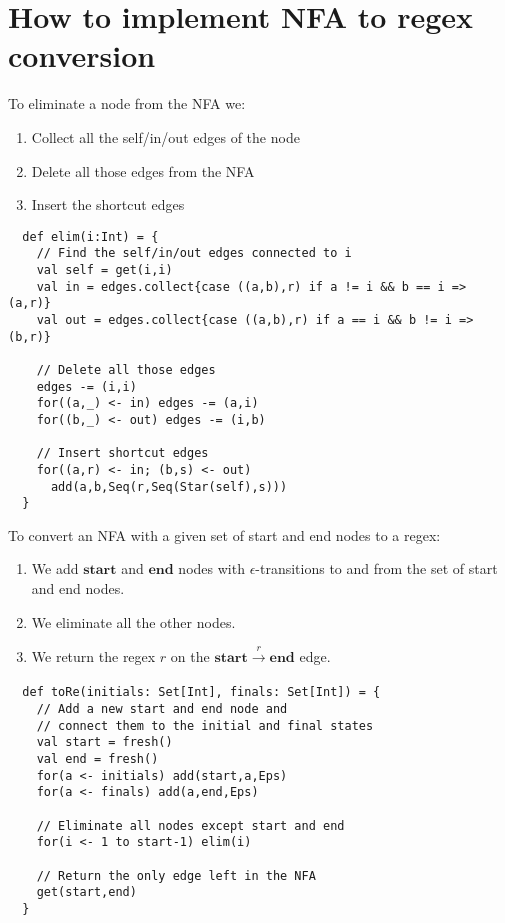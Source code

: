 \documentclass[a4paper, 11pt]{article}
\theoremstyle{definition}
\begin{document}
\newpage
\section{How to implement NFA to regex conversion}

To eliminate a node from the NFA we:
\begin{enumerate}
  \item Collect all the self/in/out edges of the node
  \item Delete all those edges from the NFA
  \item Insert the shortcut edges
\end{enumerate}
\bigskip

\begin{lstlisting}
  def elim(i:Int) = {
    // Find the self/in/out edges connected to i
    val self = get(i,i)
    val in = edges.collect{case ((a,b),r) if a != i && b == i => (a,r)}
    val out = edges.collect{case ((a,b),r) if a == i && b != i => (b,r)}

    // Delete all those edges
    edges -= (i,i)
    for((a,_) <- in) edges -= (a,i)
    for((b,_) <- out) edges -= (i,b)

    // Insert shortcut edges
    for((a,r) <- in; (b,s) <- out)
      add(a,b,Seq(r,Seq(Star(self),s)))
  }
\end{lstlisting}
\bigskip

\noindent To convert an NFA with a given set of start and end nodes to a regex:
\begin{enumerate}
  \item We add $\mathbf{start}$ and $\mathbf{end}$ nodes with $\epsilon$-transitions to and from the set of start and end nodes.
  \item We eliminate all the other nodes.
  \item We return the regex $r$ on the $\mathbf{start} \xrightarrow[]{r} \mathbf{end}$ edge.
\end{enumerate}
\bigskip

\begin{lstlisting}
  def toRe(initials: Set[Int], finals: Set[Int]) = {
    // Add a new start and end node and
    // connect them to the initial and final states
    val start = fresh()
    val end = fresh()
    for(a <- initials) add(start,a,Eps)
    for(a <- finals) add(a,end,Eps)

    // Eliminate all nodes except start and end
    for(i <- 1 to start-1) elim(i)

    // Return the only edge left in the NFA
    get(start,end)
  }
\end{lstlisting}
\bigskip
\end{document}
